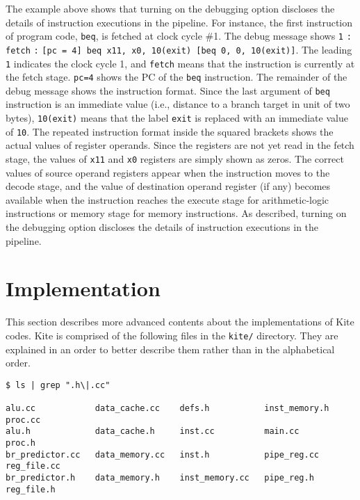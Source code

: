\documentclass[10pt]{article}
\begin{document}
The example above shows that turning on the debugging option discloses the details of instruction executions in the pipeline.
For instance, the first instruction of program code, {\tt beq}, is fetched at clock cycle \#1.
The debug message shows {\tt 1} {\tt :} {\tt fetch} {\tt :} {\tt[pc = 4] beq x11, x0, 10(exit) [beq 0, 0, 10(exit)]}.
The leading {\tt 1} indicates the clock cycle 1, and {\tt fetch} means that the instruction is currently at the fetch stage.
{\tt pc=4} shows the PC of the {\tt beq} instruction.
The remainder of the debug message shows the instruction format.
Since the last argument of {\tt beq} instruction is an immediate value (i.e., distance to a branch target in unit of two bytes), {\tt 10(exit)} means that the label {\tt exit} is replaced with an immediate value of {\tt 10}.
The repeated instruction format inside the squared brackets shows the actual values of register operands.
Since the registers are not yet read in the fetch stage, the values of {\tt x11} and {\tt x0} registers are simply shown as zeros.
The correct values of source operand registers appear when the instruction moves to the decode stage, and the value of destination operand register (if any) becomes available when the instruction reaches the execute stage for arithmetic-logic instructions or memory stage for memory instructions.
As described, turning on the debugging option discloses the details of instruction executions in the pipeline.


\section{Implementation} \label{sec:implementation}
This section describes more advanced contents about the implementations of Kite codes.
Kite is comprised of the following files in the {\tt kite/} directory.
They are explained in an order to better describe them rather than in the alphabetical order.

\begin{Verbatim}[frame=single,fontsize=\small]
$ ls | grep ".h\|.cc"

alu.cc            data_cache.cc    defs.h           inst_memory.h   proc.cc
alu.h             data_cache.h     inst.cc          main.cc         proc.h
br_predictor.cc   data_memory.cc   inst.h           pipe_reg.cc     reg_file.cc
br_predictor.h    data_memory.h    inst_memory.cc   pipe_reg.h      reg_file.h
\end{Verbatim}
\end{document}
